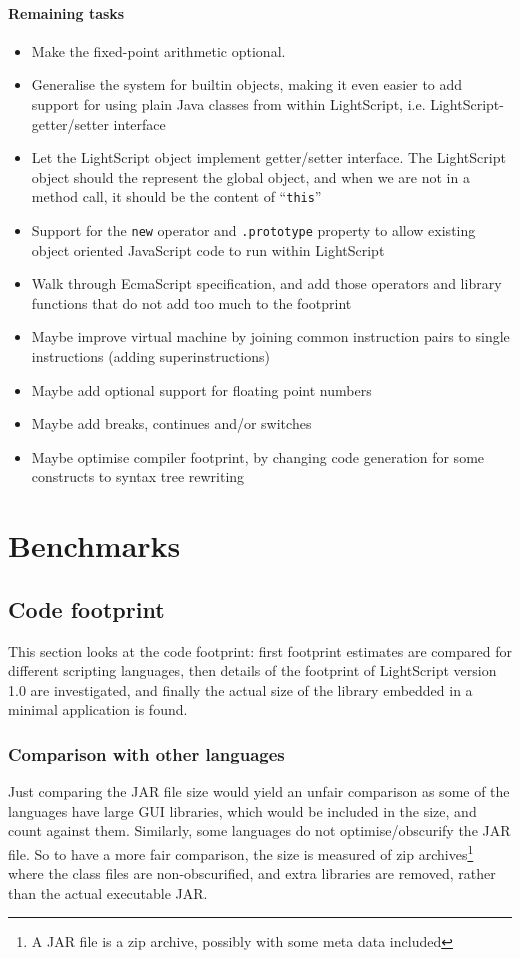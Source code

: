 \documentclass[11pt]{report}
\begin{document}
\subsubsection{Remaining tasks}
\begin{itemize}
\item Make the fixed-point arithmetic optional.
\item Generalise the system for builtin objects, making it even easier to add support for using plain Java classes from within LightScript, i.e. LightScript-getter/setter interface
\item Let the LightScript object implement getter/setter interface. The LightScript object should the represent the global object, and when we are not in a method call, it should be the content of ``\verb|this|''
\item Support for the \verb|new| operator and \verb|.prototype| property to allow existing object oriented JavaScript code to run within LightScript
\item Walk through EcmaScript specification, and add those operators and library functions that do not add too much to the footprint
\item Maybe improve virtual machine by joining common instruction pairs to single instructions (adding superinstructions)
\item Maybe add optional support for floating point numbers
\item Maybe add breaks, continues and/or switches
\item Maybe optimise compiler footprint, by changing code generation for some constructs to syntax tree rewriting
\end{itemize}

\chapter{Benchmarks}
\label{benchmark}

\section{Code footprint}
This section looks at the code footprint: first footprint estimates are compared for different scripting languages, then details of the footprint of LightScript version 1.0 are investigated, and finally the actual size of the library embedded in a minimal application is found.

\subsection{Comparison with other languages}
Just comparing the JAR file size would yield an unfair comparison as some of the languages have large GUI libraries, which would be included in the size, and count against them.
Similarly, some languages do not optimise/obscurify the JAR file.
So to have a more fair comparison, the size is measured of zip archives\footnote{A JAR file is a zip archive, possibly with some meta data included} where the class files are non-obscurified, and extra libraries are removed, rather than the actual executable JAR.
\end{document}
